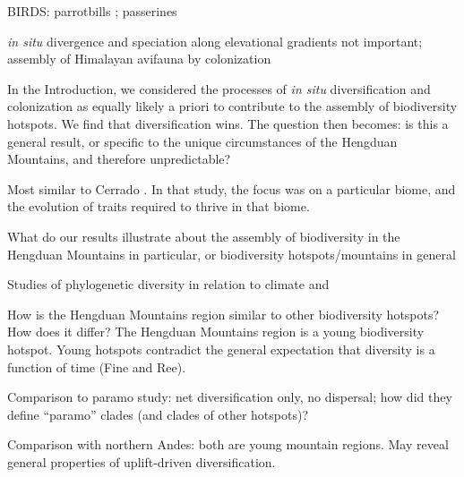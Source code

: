BIRDS: parrotbills \citep{liu2016}; passerines \citep{packert2015}

\textit{in situ} divergence and speciation along elevational gradients not important; assembly of Himalayan avifauna by colonization \citep{johansson2007}


In the Introduction, we considered the processes of \textit{in situ} diversification and colonization as equally likely a priori to contribute to the assembly of biodiversity hotspots. We find that diversification wins. The question then becomes: is this a general result, or specific to the unique circumstances of the Hengduan Mountains, and therefore unpredictable?

Most similar to Cerrado \citep{simon2009}. In that study, the focus was on a particular biome, and the evolution of traits required to thrive in that biome.

What do our results illustrate about the assembly of biodiversity in the Hengduan Mountains in particular, or biodiversity hotspots/mountains in general

Studies of phylogenetic diversity in relation to climate and 

How is the Hengduan Mountains region similar to other biodiversity hotspots? How does it differ? The Hengduan Mountains region is a young biodiversity hotspot. Young hotspots contradict the general expectation that diversity is a function of time (Fine and Ree).

Comparison to paramo study: net diversification only, no dispersal; how did they define ``paramo'' clades (and clades of other hotspots)?

Comparison with northern Andes: both are young mountain regions. May reveal general properties of uplift-driven diversification.


